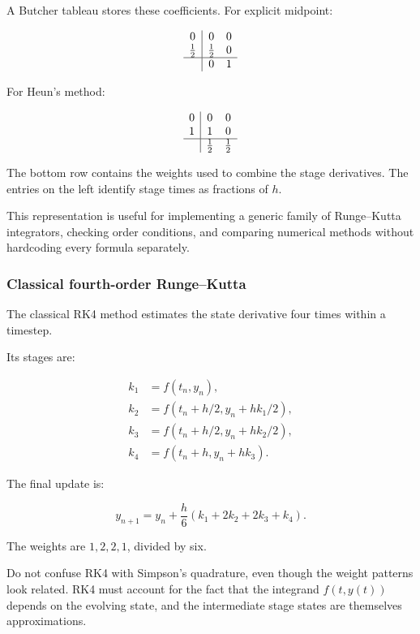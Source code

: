 A Butcher tableau stores these coefficients. For explicit midpoint:

\[
\begin{array}{c|cc} 0&0&0\\ \frac12&\frac12&0\\ \hline &0&1 \end{array}
\]

For Heun's method:

\[
\begin{array}{c|cc} 0&0&0\\ 1&1&0\\ \hline &\frac12&\frac12 \end{array}
\]

The bottom row contains the weights used to combine the stage derivatives. The entries on the left identify stage times as fractions of \(h\).

This representation is useful for implementing a generic family of Runge--Kutta integrators, checking order conditions, and comparing numerical methods without hardcoding every formula separately.

\subsubsection{Classical fourth-order Runge--Kutta}\label{02-foundations-ii-ch025-classical-fourth-order-rungekutta}

\hypertarget{02-foundations-ii-ch025-classical-fourth-order-rungekutta}{}

The classical RK4 method estimates the state derivative four times within a timestep.

Its stages are:

\[
\boxed{ \begin{aligned} k_1&=f(t_n,y_n),\\ k_2&=f(t_n+h/2,y_n+hk_1/2),\\ k_3&=f(t_n+h/2,y_n+hk_2/2),\\ k_4&=f(t_n+h,y_n+hk_3). \end{aligned} }
\]

The final update is:

\[
\boxed{ y_{n+1} = y_n+\frac h6(k_1+2k_2+2k_3+k_4) }.
\]

The weights are \(1,2,2,1\), divided by six.

Do not confuse RK4 with Simpson's quadrature, even though the weight patterns look related. RK4 must account for the fact that the integrand \(f(t,y(t))\) depends on the evolving state, and the intermediate stage states are themselves approximations.

